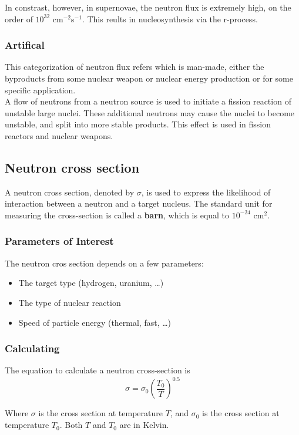 \documentclass{article}
\begin{document}
\begin{multicols*}{2}
    In constrast, however, in supernovae, the neutron flux is extremely high,
    on the order of $10^{32}$ cm$^{-2}$s$^{-1}$. This reults in nucleosynthesis
    via the r-process.
    \subsubsection{Artifical}
    This categorization of neutron flux refers which is man-made, either the
    byproducts from some nuclear weapon or nuclear energy production or for
    some specific application.\\

    A flow of neutrons from a neutron source is used to initiate a fission reaction
    of unstable large nuclei. These additional neutrons may cause the nuclei to
    become unstable, and split into more stable products. This effect is used
    in fission reactors and nuclear weapons.
    \subsection{Neutron cross section}
    A neutron cross section, denoted by $\sigma$, is used to express the likelihood
    of interaction between a neutron and a target nucleus. The standard unit for
    measuring the cross-section is called a \textbf{barn}, which is equal to
    $10^{-24}$ cm$^{2}$.

    \subsubsection{Parameters of Interest}
    The neutron cros section depends on a few parameters:
    \begin{itemize}
      \item The target type (hydrogen, uranium, \ldots)
      \item The type of nuclear reaction
      \item Speed of particle energy (thermal, fast, \ldots)
    \end{itemize}
    \subsubsection{Calculating}
    The equation to calculate a neutron cross-section is
    \[
      \sigma = \sigma_{0}\left( \frac{T_0}{T} \right)^{0.5}
    \]

    Where $\sigma$ is the cross section at temperature $T$, and $\sigma_0$ is
    the cross section at temperature $T_0$. Both $T$ and $T_0$ are in Kelvin.



\end{multicols*}
\end{document}
